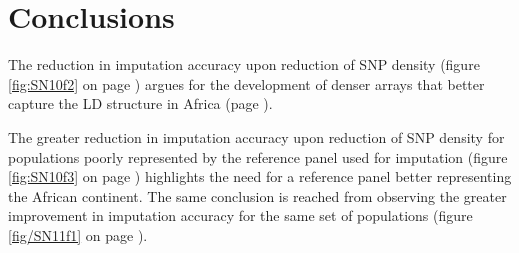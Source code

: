 \section{Conclusions}

The reduction in imputation accuracy upon reduction of \gls{SNP} density (figure \ref{fig:SN10f2} on page \pageref{fig:SN10f2}) argues for the development of denser arrays that better capture the \gls{LD} structure in Africa (page \pageref{ch:chip_design}).

The greater reduction in imputation accuracy upon reduction of \gls{SNP} density for populations poorly represented by the reference panel used for imputation (figure \ref{fig:SN10f3} on page \pageref{fig:SN10f3}) highlights the need for a reference panel better representing the African continent. The same conclusion is reached from observing the greater improvement in imputation accuracy for the same set of populations (figure \ref{fig/SN11f1} on page \pageref{fig/SN11f1}).
